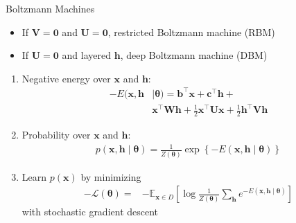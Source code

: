 \documentclass{beamer}
\newcommand{\vect}[1]{\mathbf{#1}}
\newcommand{\vects}[1]{\boldsymbol{#1}}
\newcommand{\matr}[1]{\mathbf{#1}}
\newcommand{\vb}[0]{\vect{b}}
\newcommand{\vc}[0]{\vect{c}}
\newcommand{\vh}[0]{\vect{h}}
\newcommand{\vx}[0]{\vect{x}}
\newcommand{\mW}[0]{\matr{W}}
\newcommand{\mU}[0]{\matr{U}}
\newcommand{\mV}[0]{\matr{V}}
\newcommand{\mzero}[0]{\matr{0}}
\newcommand{\TT}[0]{{\vects{\theta}}}
\newcommand{\LL}[0]{\mathcal{L}}
\newcommand{\E}[0]{\mathbb{E}}
\begin{document}
\begin{frame}{Boltzmann Machines}
\begin{minipage}{0.33\textwidth}
        \begin{minipage}{\columnwidth}
            \small 
            \begin{itemize}
                \item If $\mV=\mzero$ and $\mU=\mzero$, restricted Boltzmann
                    machine (RBM)
                \item If $\mU=\mzero$ and layered $\vh$, deep Boltzmann
                    machine (DBM)
            \end{itemize} 
        \end{minipage}
    \end{minipage}
    \hfill
    \begin{minipage}{0.65\textwidth}
        \small
        \begin{enumerate}
            \item Negative energy over $\vx$ and $\vh$:
                \begin{align*}
                -E(\vx, \vh &\mid \TT) = \vb^\top \vx +
                \vc^\top \vh + \\
                &
                \vx^\top \mW \vh + \frac{1}{2} \vx^\top \mU \vx +
                \frac{1}{2} \vh^\top \mV \vh
            \end{align*}
            \item Probability over $\vx$ and
                $\vh$:
                \begin{align*}
                p(\vx, \vh \mid \TT) = \frac{1}{Z(\TT)} \exp \left\{
                -E\left(\vx , \vh \mid \TT\right)
                \right\}
            \end{align*}
            \item Learn $p(\vx)$ by minimizing
                \begin{align*}
                    -\LL(\TT) =& -\E_{\vx \in D} \left[ \log
                    \frac{1}{Z(\TT)} \sum_{\vh}
                    e^{-E\left( \vx, \vh \mid \TT\right)}
    \right]
            \end{align*}
            with stochastic gradient descent
        \end{enumerate}
    \end{minipage}
\end{frame}
\end{document}
